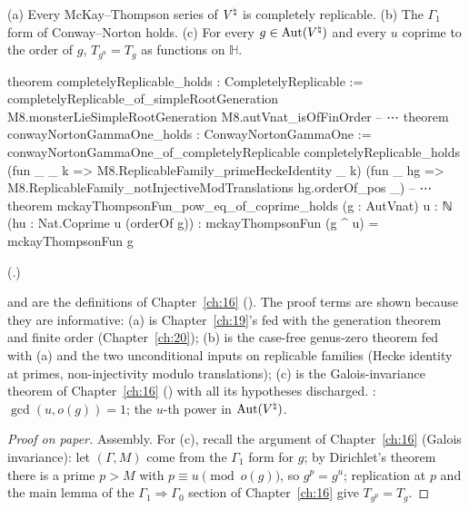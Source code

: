 \begin{theorem}\label{ch22:thm:galois}
(a) Every McKay--Thompson series of ${V^{\natural}}$ is completely replicable.  (b) The $\Gamma_1$ form of Conway--Norton holds.
(c) For every $g\in\operatorname{Aut}({V^{\natural}})$ and every $u$ coprime to the order of $g$, $T_{g^u}=T_g$ as functions on $\mathbb H$.
\end{theorem}
\begin{leancode}
theorem completelyReplicable_holds : CompletelyReplicable :=
  completelyReplicable_of_simpleRootGeneration M8.monsterLieSimpleRootGeneration
    M8.autVnat_isOfFinOrder
-- ⋯
theorem conwayNortonGammaOne_holds : ConwayNortonGammaOne :=
  conwayNortonGammaOne_of_completelyReplicable completelyReplicable_holds
    (fun _ _ k => M8.ReplicableFamily_primeHeckeIdentity _ k)
    (fun _ hg => M8.ReplicableFamily_notInjectiveModTranslations hg.orderOf_pos _)
-- ⋯
theorem mckayThompsonFun_pow_eq_of_coprime_holds (g : AutVnat) {u : ℕ}
    (hu : Nat.Coprime u (orderOf g)) : mckayThompsonFun (g ^ u) = mckayThompsonFun g
\end{leancode}
(.)
\begin{dictionary}
 and  are the definitions of Chapter~\ref{ch:16}
().  The proof terms are shown because they are informative: (a) is
Chapter~\ref{ch:19}'s  fed with the generation theorem
 and finite order  (Chapter~\ref{ch:20}); (b) is the
case-free genus-zero theorem fed with (a) and the two unconditional inputs on replicable families (Hecke identity at primes,
non-injectivity modulo translations); (c) is the Galois-invariance theorem of Chapter~\ref{ch:16}
() with all its hypotheses discharged.
: $\gcd(u,o(g))=1$;  the $u$-th power in $\operatorname{Aut}({V^{\natural}})$.
\end{dictionary}
\begin{proof}[Proof on paper]
Assembly.  For (c), recall the argument of Chapter~\ref{ch:16} (Galois invariance): let $(\Gamma,M)$ come from the
$\Gamma_1$ form for $g$; by Dirichlet's theorem there is a prime $p>M$ with $p\equiv u\pmod{o(g)}$, so $g^p=g^u$; replication
at $p$ and the main lemma of the $\Gamma_1\Rightarrow\Gamma_0$ section of Chapter~\ref{ch:16} give $T_{g^p}=T_g$.
\end{proof}
